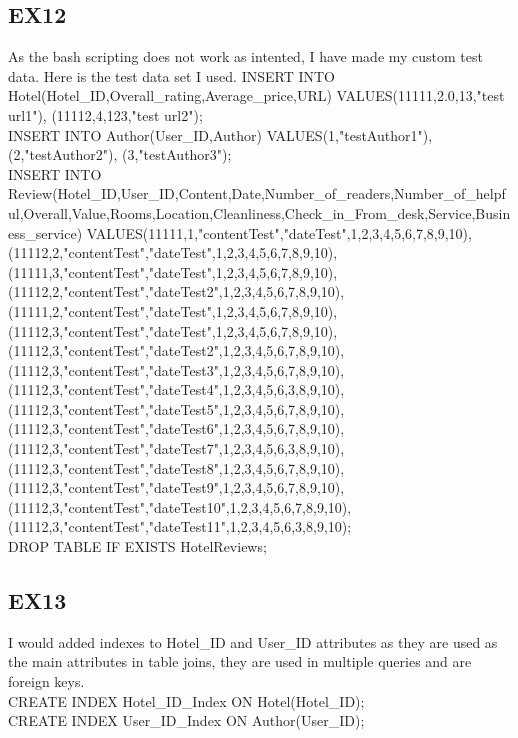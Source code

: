 \documentclass{article}
\begin{document}
	\subsection{EX12}
	As the bash scripting does not work as intented, I have made my custom test data.
	Here is the test data set I used.
	INSERT INTO Hotel(Hotel\_ID,Overall\_rating,Average\_price,URL)
	VALUES(11111,2.0,13,"test url1"),
	(11112,4,123,"test url2");
	\\
	INSERT INTO Author(User\_ID,Author)
	VALUES(1,"testAuthor1"),
	(2,"testAuthor2"),
	(3,"testAuthor3");
	\\
	INSERT INTO Review(Hotel\_ID,User\_ID,Content,Date,Number\_of\_readers,Number\_of\_helpful,Overall,Value,Rooms,Location,Cleanliness,Check\_in\_From\_desk,Service,Business\_service)
	VALUES(11111,1,"contentTest","dateTest",1,2,3,4,5,6,7,8,9,10),
	(11112,2,"contentTest","dateTest",1,2,3,4,5,6,7,8,9,10),
	(11111,3,"contentTest","dateTest",1,2,3,4,5,6,7,8,9,10),
	(11112,2,"contentTest","dateTest2",1,2,3,4,5,6,7,8,9,10),
	(11111,2,"contentTest","dateTest",1,2,3,4,5,6,7,8,9,10),
	(11112,3,"contentTest","dateTest",1,2,3,4,5,6,7,8,9,10),
	(11112,3,"contentTest","dateTest2",1,2,3,4,5,6,7,8,9,10),
	(11112,3,"contentTest","dateTest3",1,2,3,4,5,6,7,8,9,10),
	(11112,3,"contentTest","dateTest4",1,2,3,4,5,6,3,8,9,10),
	(11112,3,"contentTest","dateTest5",1,2,3,4,5,6,7,8,9,10),
	(11112,3,"contentTest","dateTest6",1,2,3,4,5,6,7,8,9,10),
	(11112,3,"contentTest","dateTest7",1,2,3,4,5,6,3,8,9,10),
	(11112,3,"contentTest","dateTest8",1,2,3,4,5,6,7,8,9,10),
	(11112,3,"contentTest","dateTest9",1,2,3,4,5,6,7,8,9,10),
	(11112,3,"contentTest","dateTest10",1,2,3,4,5,6,7,8,9,10),
	(11112,3,"contentTest","dateTest11",1,2,3,4,5,6,3,8,9,10);
	\\
	DROP TABLE IF EXISTS HotelReviews;
	
	
	\subsection{EX13}
	I would added indexes to Hotel\_ID and User\_ID attributes as they are used as the main attributes in table joins, they are used in multiple queries and are foreign keys. \\
	CREATE INDEX Hotel\_ID\_Index ON Hotel(Hotel\_ID); \\
	CREATE INDEX User\_ID\_Index ON Author(User\_ID);
	
\end{document}
